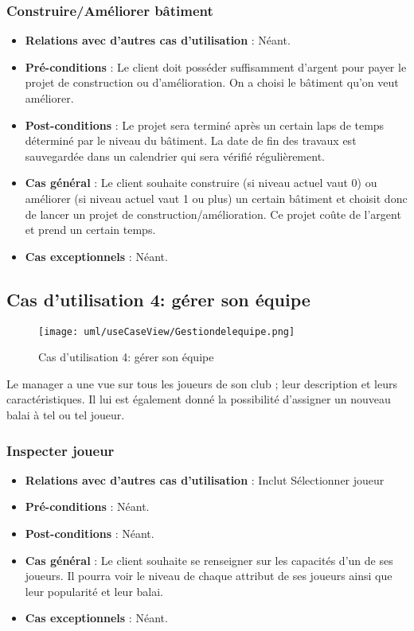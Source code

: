 \documentclass[a4paper,titlepage]{scrreprt}
\begin{document}
    \subsubsection{Construire/Améliorer bâtiment}
      \begin{itemize}
        \item \textbf{Relations avec d'autres cas d'utilisation}  : Néant.
        \item \textbf{Pré-conditions} : Le client doit posséder suffisamment d’argent pour payer le projet de construction ou d’amélioration. On a choisi le bâtiment qu’on veut améliorer.
        \item \textbf{Post-conditions} : Le projet sera terminé après un certain laps de temps déterminé par le niveau du bâtiment. La date de fin des travaux est sauvegardée dans un \gls{calendrier} qui sera vérifié régulièrement.
        \item \textbf{Cas général} : Le client souhaite construire (si niveau actuel vaut 0) ou améliorer (si niveau actuel vaut 1 ou plus) un certain bâtiment et choisit donc de lancer un projet de construction/amélioration. Ce projet coûte de l’argent et prend un certain temps.
        \item \textbf{Cas exceptionnels} : Néant.
      \end{itemize}

  \subsection{Cas d'utilisation 4: gérer son équipe}
  \begin{figure}[H]
    \center
    \texttt{[image: uml/useCaseView/Gestiondelequipe.png]}
    \caption{Cas d'utilisation 4: gérer son équipe}
  \end{figure}	
  Le manager a une vue sur tous les joueurs de son \gls{club} ;  
  leur description et leurs caractéristiques. 
  Il lui est également donné la possibilité d'assigner un nouveau balai à tel ou tel joueur.
    \subsubsection{Inspecter joueur}
      \begin{itemize}
        \item \textbf{Relations avec d'autres cas d'utilisation}  : Inclut Sélectionner joueur
        \item \textbf{Pré-conditions} : Néant.
        \item \textbf{Post-conditions} : Néant.
        \item \textbf{Cas général} : Le client souhaite se renseigner sur les capacités d’un de ses joueurs. Il pourra voir le niveau de chaque attribut de ses joueurs ainsi que leur popularité et leur balai.

        \item \textbf{Cas exceptionnels} : Néant.
      \end{itemize}
\end{document}
